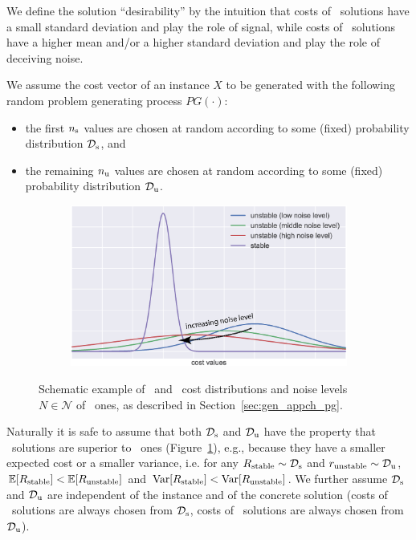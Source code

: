 We define the solution ``desirability'' by the intuition that costs of \good\
solutions have a small standard deviation and play the role of signal,
while costs of \bad\ solutions have a higher mean and/or a higher standard
deviation and play the role of deceiving noise.

We assume the cost vector of an instance $X$ to be generated with the following
random problem generating process $PG(\cdot)$:
\begin{itemize}
  \item[1)] the first $n_\text{s}$ values are chosen at random according to some
            (fixed) probability distribution $\mathcal{D}_\text{s}$, and
  \item[2)] the remaining $n_\text{u}$ values are chosen at random according to some
            (fixed) probability distribution $\mathcal{D}_\text{u}$.
\end{itemize}
%

\begin{figure}[t!]
  \centering
  \begin{subfigure}[b]{.8\textwidth}
      \includegraphics[width=\linewidth]{figures/ch_generic_approach/stable_and_unstable_distr}
  \end{subfigure}
  \caption{Schematic example of \good\ and \bad\ cost distributions and noise
  levels $N \in \mathcal{N}$ of \bad\ ones, as described in
  Section~\ref{sec:gen_appch_pg}.}
  \label{fig:stable_and_unstable_solutions}
\end{figure}

Naturally it is safe to assume that both $\mathcal{D}_\text{s}$ and $\mathcal{D}_\text{u}$ have the property that
\good\ solutions are superior to \bad\ ones
(Figure~\ref{fig:stable_and_unstable_solutions}), e.g., because they have a
smaller expected cost or a smaller variance, i.e. for any $R_\text{stable} \sim
\mathcal{D}_\text{s}$ and $r_\text{unstable} \sim \mathcal{D}_\text{u}$, $\mathbb{E} [R_\text{stable}] < \mathbb{E} [R_\text{unstable}]$ 
and ${\mathrm{Var}} [R_\text{stable}] < {\mathrm{Var}} [R_\text{unstable}]$.
We further assume $\mathcal{D}_\text{s}$ and $\mathcal{D}_\text{u}$ are independent of the
instance and of the concrete solution (costs of \good\ solutions are always
chosen from $\mathcal{D}_\text{s}$, costs of \bad\ solutions are always chosen from $\mathcal{D}_\text{u}$).


